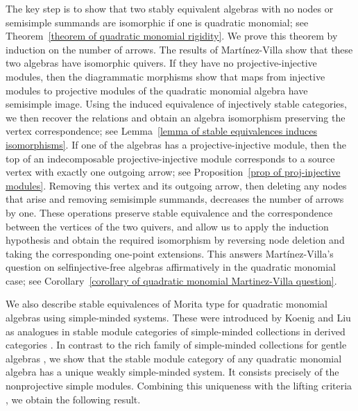 \documentclass[11pt]{article}
\theoremstyle{definition}
\begin{document}
	The key step is to show that two stably equivalent algebras with no nodes or semisimple summands are isomorphic if one is quadratic monomial; see Theorem~\ref{theorem of quadratic monomial rigidity}. 
	We prove this theorem by induction on the number of arrows. The results of Mart\'inez-Villa \cite[Section~3]{Mar90} show that these two algebras have isomorphic quivers. 
	If they have no projective-injective modules, then the diagrammatic morphisms show that maps from injective modules to projective modules of the quadratic monomial algebra have semisimple image.
	Using the induced equivalence of injectively stable categories, we then recover the relations and obtain an algebra isomorphism preserving the vertex correspondence; see Lemma~\ref{lemma of stable equivalences induces isomorphisms}.
	If one of the algebras has a projective-injective module, then the top of an indecomposable projective-injective module corresponds to a source vertex with exactly one outgoing arrow; see Proposition~\ref{prop of proj-injective modules}. 
	Removing this vertex and its outgoing arrow, then deleting any nodes that arise and removing semisimple summands, decreases the number of arrows by one.
	These operations preserve stable equivalence and the correspondence between the vertices of the two quivers, and allow us to apply the induction hypothesis and obtain the required isomorphism by reversing node deletion and taking the corresponding one-point extensions.
	This answers Mart\'inez-Villa's question on selfinjective-free algebras affirmatively in the quadratic monomial case; see Corollary~\ref{corollary of quadratic monomial Martinez-Villa question}.

	\medskip

	We also describe stable equivalences of Morita type for quadratic monomial algebras using simple-minded systems. These were introduced by Koenig and Liu \cite{KL12} as analogues in stable module categories of simple-minded collections in derived categories \cite{Ric02,KY14}. In contrast to the rich family of simple-minded collections for gentle algebras \cite{Cha26}, we show that the stable module category of any quadratic monomial algebra has a unique weakly simple-minded system. It consists precisely of the nonprojective simple modules. Combining this uniqueness with the lifting criteria \cite{Lin96,Liu03,Liu06}, we obtain the following result.
\end{document}
